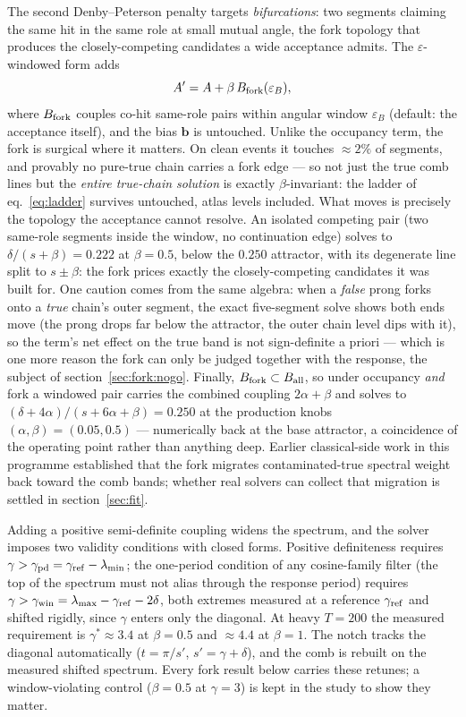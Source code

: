 \documentclass[11pt,a4paper]{article}
\begin{document}
The second Denby--Peterson penalty targets \emph{bifurcations}: two
segments claiming the same hit in the same role at small mutual
angle, the fork topology that produces the closely-competing
candidates a wide acceptance admits. The $\varepsilon$-windowed form
adds
\begin{equation}
A'=A+\beta\,B_{\rm fork}(\varepsilon_B),
\label{eq:fork}
\end{equation}
where $B_{\rm fork}$ couples co-hit same-role pairs within angular
window $\varepsilon_B$ (default: the acceptance itself), and the bias
$\mathbf{b}$ is untouched. Unlike the
occupancy term, the fork is surgical where it matters. On clean
events it touches $\approx2\%$ of segments, and provably no
pure-true chain carries a fork edge — so not just the true comb
lines but the \emph{entire true-chain solution} is exactly
$\beta$-invariant: the ladder of eq.~\eqref{eq:ladder} survives
untouched, atlas levels included. What moves is precisely the
topology the acceptance cannot resolve. An isolated competing pair
(two same-role segments inside the window, no continuation edge)
solves to $\delta/(s+\beta)=0.222$ at $\beta=0.5$, below the
$0.250$ attractor, with its degenerate line split to $s\pm\beta$:
the fork prices exactly the closely-competing candidates it was
built for. One caution comes from the same algebra: when a
\emph{false} prong forks onto a \emph{true} chain's outer segment,
the exact five-segment solve shows both ends move (the prong drops
far below the attractor, the outer chain level dips with it), so the
term's net effect on the true band is not sign-definite a priori —
which is one more reason the fork can only be judged together with
the response, the subject of section~\ref{sec:fork:nogo}. Finally,
$B_{\rm fork}\subset B_{\rm all}$, so under occupancy \emph{and}
fork a windowed pair carries the combined coupling $2\alpha+\beta$
and solves to $(\delta+4\alpha)/(s+6\alpha+\beta)=0.250$ at the
production knobs $(\alpha,\beta)=(0.05,0.5)$ — numerically back at
the base attractor, a coincidence of the operating point rather
than anything deep. Earlier classical-side work in this programme
established that the fork migrates contaminated-true spectral weight
back toward the comb bands; whether real solvers can collect that
migration is settled in section~\ref{sec:fit}.

Adding a positive semi-definite coupling widens the spectrum, and
the solver imposes two validity conditions with closed forms.
Positive definiteness requires $\gamma>\gamma_{\rm pd}=\gamma_{\rm
ref}-\lambda_{\min}$; the one-period condition of any cosine-family
filter (the top of the spectrum must not alias through the response
period) requires $\gamma>\gamma_{\rm win}=\lambda_{\max}-\gamma_{\rm
ref}-2\delta$, both extremes measured at a reference
$\gamma_{\rm ref}$ and shifted rigidly, since $\gamma$ enters only
the diagonal. At heavy $T=200$ the measured requirement is
$\gamma^*\approx3.4$ at $\beta=0.5$ and $\approx4.4$ at $\beta=1$.
The notch tracks the diagonal automatically ($t=\pi/s'$,
$s'=\gamma+\delta$), and the comb is rebuilt on the measured shifted
spectrum. Every fork result below carries these retunes; a
window-violating control ($\beta=0.5$ at $\gamma=3$) is kept in the
study to show they matter.
\end{document}
